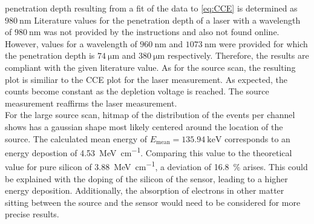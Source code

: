 penetration depth resulting from a fit of the data to \autoref{eq:CCE} is determined as $\qty{980}{\nano\metre}$
Literature values for the penetration depth of a laser with a wavelength of $\qty{980}{\nano\metre}$ was not provided
by the instructions and also not found online. However, values for a wavelength of $\qty{960}{\nano\metre}$ and $\qty{1073}{\nano\metre}$
were provided for which the penetration depth is $\qty{74}{\micro\metre}$ and $\qty{380}{\micro\metre}$ respectively\cite{SiliconStrip}. Therefore,
the results are compliant with the given literature value. As for the source scan, the resulting plot is similiar 
to the CCE plot for the laser measurement. As expected, the counts become constant as the depletion voltage is reached.
The source measurement reaffirms the laser measurement.\\
For the large source scan, hitmap of the distribution of the events per channel shows has a gaussian shape most likely centered around the location of the source.
The calculated mean energy of $E_{\mathrm{mean}} = \qty{135.94}{\kilo\electronvolt}$ corresponds to an energy depostion of \qty{4.53}{\mega\electronvolt\per\centi\metre}.
Comparing this value to the theoretical value for pure silicon of \qty{3.88}{\mega\electronvolt\per\centi\metre}, a deviation of \qty{16.8}{\percent} arises.
This could be explained with the doping of the silicon of the sensor, leading to a higher energy deposition. Additionally, the absorption of electrons in other 
matter sitting between the source and the sensor would need to be considered for more precise results.
